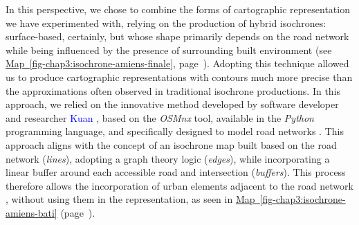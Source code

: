 \begin{refsegment}
In this perspective, we chose to combine the forms of cartographic representation we have experimented with, relying on the production of hybrid isochrones: surface-based, certainly, but whose shape primarily depends on the road network while being influenced by the presence of surrounding built environment (see \hyperref[fig-chap3:isochrone-amiens-finale]{Map~\ref{fig-chap3:isochrone-amiens-finale}}, page~\pageref{fig-chap3:isochrone-amiens-finale}). Adopting this technique allowed us to produce cartographic representations with contours much more precise than the approximations often observed in traditional isochrone productions. In this approach, we relied on the innovative method developed by software developer and researcher \textcolor{blue}{Kuan} \textcolor{blue}{\textcite{butts_better_2017}}, based on the \textsl{OSMnx} tool, available in the \textsl{Python} programming language, and specifically designed to model road networks \textcolor{blue}{\autocite[132]{boeing_osmnx_2017}}. This approach aligns with the concept of an isochrone map built based on the road network (\textsl{lines}), adopting a graph theory logic (\textsl{edges}), while incorporating a linear buffer around each accessible road and intersection (\textsl{buffers}). This process therefore allows the incorporation of urban elements adjacent to the road network \textcolor{blue}{\autocite[135]{boeing_osmnx_2017}}, without using them in the representation, as seen in \hyperref[fig-chap3:isochrone-amiens-bati]{Map~\ref{fig-chap3:isochrone-amiens-bati}} (page~\pageref{fig-chap3:isochrone-amiens-bati}).%


\end{refsegment}
